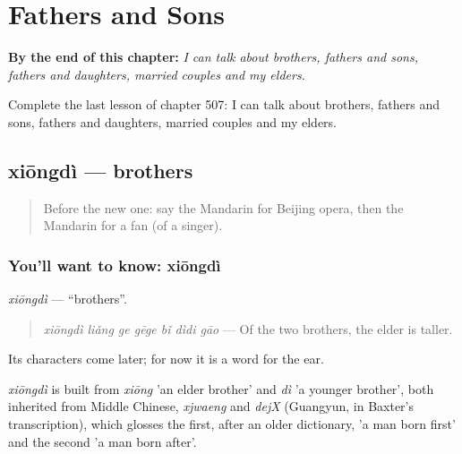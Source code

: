 
\chapter{Fathers and Sons}
\label{ch:zh-fathers-and-sons}

\begin{chapteropening}
\textbf{By the end of this chapter:} \emph{I can talk about brothers, fathers and sons, fathers and daughters, married couples and my elders.}

Complete the last lesson of chapter 507: I can talk about brothers, fathers and sons, fathers and daughters, married couples and my elders.
\end{chapteropening}

\section[xiōngdì]{xiōngdì — brothers}

\label{lesson:ZH-C507-xiongdi}



\begin{quote}
Before the new one: say the Mandarin for Beijing opera, then the Mandarin for a fan (of a singer).
\end{quote}

\subsection*{You'll want to know: xiōngdì}
\emph{xiōngdì} — \textquotedblleft{}brothers\textquotedblright{}.

\begin{quote}
\emph{xiōngdì liǎng ge gēge bǐ dìdi gāo} — Of the two brothers, the elder is taller.
\end{quote}

Its characters come later; for now it is a word for the ear.

\begin{cousinweb}
\emph{xiōngdì} is built from \emph{xiōng} 'an elder brother' and \emph{dì} 'a younger brother', both inherited from Middle Chinese, \emph{xjwaeng} and \emph{dejX} (Guangyun, in Baxter's transcription), which glosses the first, after an older dictionary, 'a man born first' and the second 'a man born after'.
\end{cousinweb}

